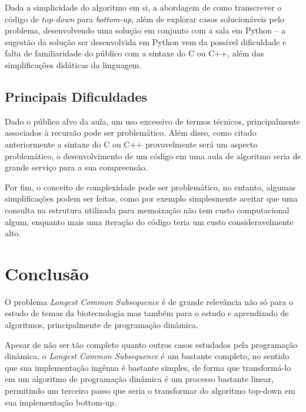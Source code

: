 \documentclass[11pt]{article}
\begin{document}
Dada a simplicidade do algoritmo em si, a abordagem de como transcrever o código
de \emph{top-down} para \emph{bottom-up}, além de explorar casos solucionáveis
pelo problema, desenvolvendo uma solução em conjunto com a sala em Python -- a
sugestão da solução ser desenvolvida em Python vem da possível dificuldade  e
falta de familiaridade do público com a sintaxe do C ou C++, além das
simplificações didáticas da linguagem.

\subsection{Principais Dificuldades}
Dado o público alvo da aula, um uso excessivo de termos técnicos, principalmente
associados à recursão pode ser problemático. Além disso, como citado
anteriormente a sintaxe do C ou C++ provavelmente será um aspecto problemático,
o desenvolvimento de um código em uma aula de algoritmo seria de grande serviço
para a sua compreensão.

Por fim, o conceito de complexidade pode ser problemático, no entanto, algumas
simplificações podem ser feitas, como por exemplo simplesmente aceitar que uma
consulta na estrutura utilizada para memoização não tem custo computacional
algum, enquanto mais uma iteração do código teria um custo consideravelmente alto.

\section{Conclusão}
O problema \emph{Longest Common Subsequence} é de grande relevância não só para
o estudo de temas da biotecnologia mas também para o estudo e aprendizado de
algoritmos, principalmente de programação dinâmica.

Apesar de não ser tão completo quanto outros casos estudados pela programação dinâmica, o
\emph{Longest Common Subsequence} é um bastante completo, no sentido que sua
implementação ingênua é bastante simples, de forma que transformá-lo em um
algoritmo de programação dinâmica é um processo bastante linear, permitindo um
terceiro passo que seria o transformar do algoritmo top-down em sua
implementação bottom-up.
\end{document}
